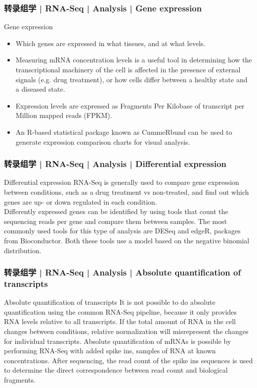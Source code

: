 \begin{frame}
  \frametitle{转录组学 | RNA-Seq | Analysis | Gene expression}
  \begin{block}{Gene expression}
    \begin{itemize}
      \item Which genes are expressed in what tissues, and at what levels.
      \item Measuring mRNA concentration levels is a useful tool in determining how the transcriptional machinery of the cell is affected in the presence of external signals (e.g. drug treatment), or how cells differ between a healthy state and a diseased state.
      \item Expression levels are expressed as Fragments Per Kilobase of transcript per Million mapped reads (FPKM).
      \item An R-based statistical package known as CummeRbund can be used to generate expression comparison charts for visual analysis.
    \end{itemize}
  \end{block}
\end{frame}

\begin{frame}
  \frametitle{转录组学 | RNA-Seq | Analysis | Differential expression}
  \begin{block}{Differential expression}
 RNA-Seq is generally used to compare gene expression between conditions, such as a drug treatment vs non-treated, and find out which genes are up- or down regulated in each condition.\\
 \vspace{0.5em}
 Differently expressed genes can be identified by using tools that count the sequencing reads per gene and compare them between samples. The most commonly used tools for this type of analysis are DESeq and edgeR, packages from Bioconductor. Both these tools use a model based on the negative binomial distribution.
  \end{block}
\end{frame}

\begin{frame}
  \frametitle{转录组学 | RNA-Seq | Analysis | Absolute quantification of transcripts}
  \begin{block}{Absolute quantification of transcripts}
 It is not possible to do absolute quantification using the common RNA-Seq pipeline, because it only provides RNA levels relative to all transcripts. If the total amount of RNA in the cell changes between conditions, relative normalization will misrepresent the changes for individual transcripts. Absolute quantification of mRNAs is possible by performing RNA-Seq with added spike ins, samples of RNA at known concentrations. After sequencing, the read count of the spike ins sequences is used to determine the direct correspondence between read count and biological fragments.
  \end{block}
\end{frame}

